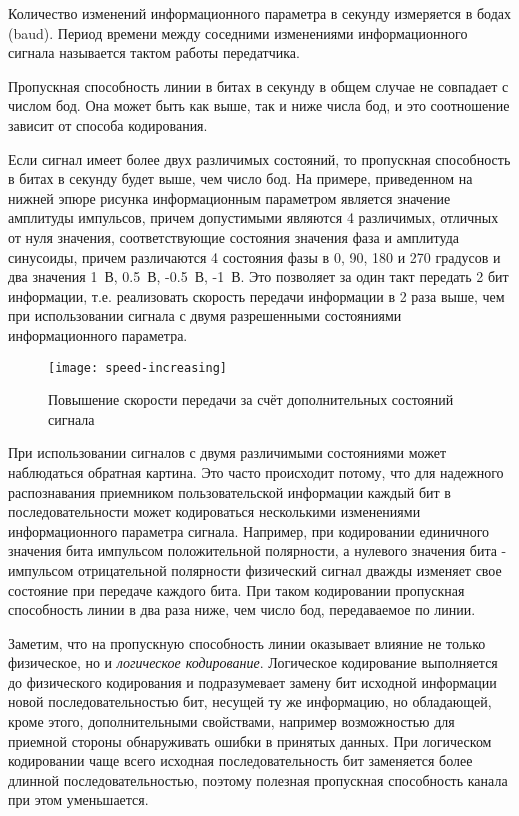 Количество изменений информационного параметра в секунду измеряется в бодах (baud).
Период времени между соседними изменениями информационного сигнала называется тактом работы передатчика.

Пропускная способность линии в битах в секунду в общем случае не совпадает с числом бод.
Она может быть как выше, так и ниже числа бод, и это соотношение зависит от способа кодирования.

Если сигнал имеет более двух различимых состояний, то пропускная способность в битах в секунду будет выше, чем число бод.
На примере, приведенном на нижней эпюре рисунка информационным параметром является значение амплитуды импульсов, причем допустимыми являются 4 различимых, отличных от нуля значения, соответствующие состояния значения фаза и амплитуда синусоиды, причем различаются 4 состояния фазы в 0, 90, 180 и 270 градусов и два значения 1~В, 0.5~В, -0.5~В, -1~В.
Это позволяет за один такт передать 2 бит информации, т.е. реализовать скорость передачи информации в 2 раза выше, чем при использовании сигнала с двумя разрешенными состояниями информационного параметра.

\begin{figure}
    \centering
    \texttt{[image: speed-increasing]}
    \caption{Повышение скорости передачи за счёт дополнительных состояний сигнала}
    \label{fig:speed-increasing}
\end{figure}

При использовании сигналов с двумя различимыми состояниями может наблюдаться обратная картина.
Это часто происходит потому, что для надежного распознавания приемником пользовательской информации каждый бит в последовательности может кодироваться несколькими изменениями информационного параметра сигнала.
Например, при кодировании единичного значения бита импульсом положительной полярности, а нулевого значения бита - импульсом отрицательной полярности физический сигнал дважды изменяет свое состояние при передаче каждого бита.
При таком кодировании пропускная способность линии в два раза ниже, чем число бод, передаваемое по линии.

Заметим, что на пропускную способность линии оказывает влияние не только физическое, но и \emph{логическое кодирование}.
Логическое кодирование выполняется до физического кодирования и подразумевает замену бит исходной информации новой последовательностью бит, несущей ту же информацию, но обладающей, кроме этого, дополнительными свойствами, например возможностью для приемной стороны обнаруживать ошибки в принятых данных.
При логическом кодировании чаще всего исходная последовательность бит заменяется более длинной последовательностью, поэтому полезная пропускная способность канала при этом уменьшается.

